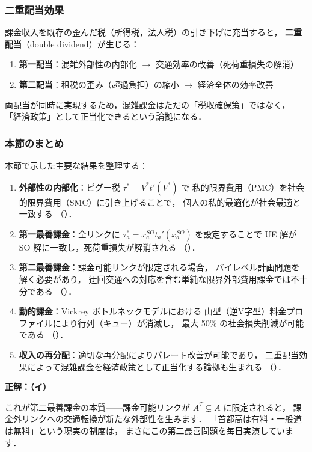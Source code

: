 \subsubsection*{二重配当効果}

課金収入を既存の歪んだ税（所得税，法人税）の引き下げに充当すると，
\textbf{二重配当}（double dividend）が生じる\cite{Pigou1920}：

\begin{enumerate}
  \item \textbf{第一配当}：混雑外部性の内部化 $\rightarrow$ 交通効率の改善（死荷重損失の解消）
  \item \textbf{第二配当}：租税の歪み（超過負担）の縮小 $\rightarrow$ 経済全体の効率改善
\end{enumerate}

両配当が同時に実現するため，混雑課金はただの「税収確保策」ではなく，
「経済政策」として正当化できるという論拠になる．

\subsubsection*{本節のまとめ}

本節で示した主要な結果を整理する：
\begin{enumerate}
  \item \textbf{外部性の内部化}：ピグー税 $\tau^* = V^* t'(V^*)$ で
        私的限界費用（PMC）を社会的限界費用（SMC）に引き上げることで，
        個人の私的最適化が社会最適と一致する
        （）．
  \item \textbf{第一最善課金}：全リンクに $\tau_a^* = x_a^{SO} t_a'(x_a^{SO})$
        を設定することで UE 解が SO 解に一致し，死荷重損失が解消される
        （）．
  \item \textbf{第二最善課金}：課金可能リンクが限定される場合，
        バイレベル計画問題を解く必要があり，
        迂回交通への対応を含む単純な限界外部費用課金では不十分である
        （）．
  \item \textbf{動的課金}：Vickrey ボトルネックモデルにおける
        山型（逆V字型）料金プロファイルにより行列（キュー）が消滅し，
        最大 50\% の社会損失削減が可能である
        （）．
  \item \textbf{収入の再分配}：適切な再分配によりパレート改善が可能であり，
        二重配当効果によって混雑課金を経済政策として正当化する論拠も生まれる
        （）．
\end{enumerate}

\begin{example}[title={クイズ 10 正解・解説}]
\label{ans:q10}
\textbf{正解：（イ）}

これが第二最善課金の本質——課金可能リンクが $A^T\subsetneq A$ に限定されると，
課金外リンクへの交通転換が新たな外部性を生みます．
「首都高は有料・一般道は無料」という現実の制度は，
まさにこの第二最善問題を毎日実演しています．
\end{example}

